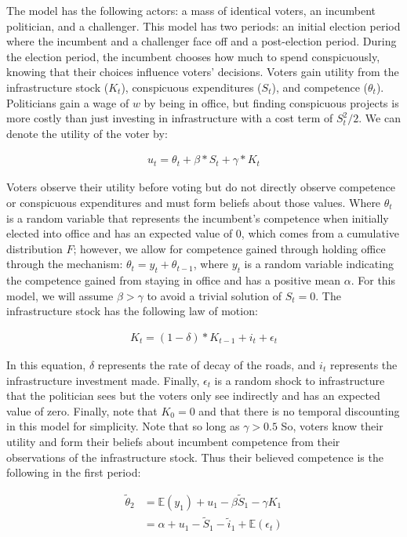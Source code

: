 The model has the following actors: a mass of identical voters, an incumbent politician, and a challenger. 
This model has two periods: an initial election period where the incumbent and a challenger face off and a post-election period. 
During the election period, the incumbent chooses how much to spend conspicuously, knowing that their choices influence voters' decisions. 
Voters gain utility from the infrastructure stock ($K_t$), conspicuous expenditures ($S_t$), and competence ($\theta_t$). 
Politicians gain a wage of $w$ by being in office, but finding conspicuous projects is more costly than just investing in infrastructure with a cost term of $S_t^2/2$. 
We can denote the utility of the voter by:

\begin{align}
    u_t=\theta_t+\beta*S_t+\gamma*K_t
\end{align}

Voters observe their utility before voting but do not directly observe competence or conspicuous expenditures and must form beliefs about those values. 
Where $\theta_t$ is a random variable that represents the incumbent's competence when initially elected into office and has an expected value of 0, which comes from a cumulative distribution $F$; however, we allow for competence gained through holding office through the mechanism: $\theta_t=y_t+\theta_{t-1}$, where $y_t$ is a random variable indicating the competence gained from staying in office and has a positive mean $\alpha$. 
For this model, we will assume $\beta>\gamma$ to avoid a trivial solution of $S_t=0$. 
The infrastructure stock has the following law of motion:

\begin{align}
    K_t=(1-\delta)*K_{t-1}+i_t+\epsilon_t
\end{align}

In this equation, $\delta$ represents the rate of decay of the roads, and $i_t$ represents the infrastructure investment made. 
Finally, $\epsilon_t$ is a random shock to infrastructure that the politician sees but the voters only see indirectly and has an expected value of zero. 
Finally, note that $K_0=0$ and that there is no temporal discounting in this model for simplicity. 
Note that so long as $\gamma>0.5$ So, voters know their utility and form their beliefs about incumbent competence from their observations of the infrastructure stock. 
Thus their believed competence is the following in the first period:

\begin{align*}
    \tilde{\theta}_2&=\mathbb{E}(y_1)+u_1-\beta \tilde{S}_1-\gamma K_1 \\
    &=\alpha+u_1-\tilde{S}_1-\tilde{i}_1+\mathbb{E}(\epsilon_t)
\end{align*}

